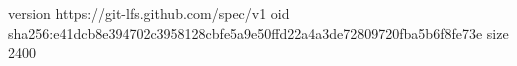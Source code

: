 version https://git-lfs.github.com/spec/v1
oid sha256:e41dcb8e394702c3958128cbfe5a9e50ffd22a4a3de72809720fba5b6f8fe73e
size 2400
